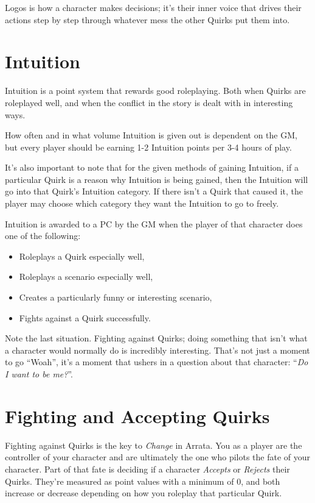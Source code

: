 \documentclass[../main.tex]{subfiles}
\begin{document}
    Logos is how a character makes decisions; it's their inner voice that drives their actions step by step through whatever mess the other Quirks put them into.

    \section{Intuition}\label{intuition}

    Intuition is a point system that rewards good roleplaying. Both when Quirks are roleplayed well, and when the conflict in the story is dealt with in interesting ways.

    How often and in what volume Intuition is given out is dependent on the GM, but every player should be earning 1-2 Intuition points per 3-4 hours of play.

    It's also important to note that for the given methods of gaining Intuition, if a particular Quirk is a reason why Intuition is being gained, then the Intuition will go into that Quirk's Intuition category. If there isn't a Quirk that caused it, the player may choose which category they want the Intuition to go to freely.

    Intuition is awarded to a PC by the GM when the player of that character does one of the following:

    \begin{itemize}
        \item Roleplays a Quirk especially well,
        \item Roleplays a scenario especially well,
        \item Creates a particularly funny or interesting scenario,
        \item Fights against a Quirk successfully.
    \end{itemize}

    Note the last situation. Fighting against Quirks; doing something that isn't what a character would normally do is incredibly interesting. That's not just a moment to go ``Woah'', it's a moment that ushers in a question about that character: ``\emph{Do I want to be me?}''.

    \section{Fighting and Accepting Quirks}
    
    Fighting against Quirks is the key to \emph{Change} in Arrata. You as a player are the controller of your character and are ultimately the one who pilots the fate of your character. Part of that fate is deciding if a character \emph{Accepts} or \emph{Rejects} their Quirks. They're measured as point values with a minimum of 0, and both increase or decrease depending on how you roleplay that particular Quirk.
\end{document}
